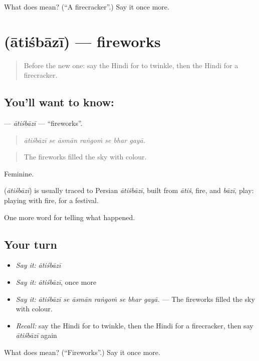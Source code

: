 \begin{tcolorbox}[breakable,colback=teal!4,colframe=teal!35!black,title={Before you move on}]
What does  mean? (\textquotedblleft{}A firecracker\textquotedblright{}.) Say it once more.
\end{tcolorbox}
\section[\texorpdfstring{\hi{आतिशबाज़ी} (ātiśbāzī)}{आतिशबाज़ी (ātiśbāzī)}]{ (ātiśbāzī) — fireworks}

\label{lesson:HI-C328-atisbazi}



\begin{quote}
Before the new one: say the Hindi for to twinkle, then the Hindi for a firecracker.
\end{quote}

\subsection*{You'll want to know: }
\textbf{} — \emph{ātiśbāzī} — \textquotedblleft{}fireworks\textquotedblright{}.

\begin{quote}
      
\end{quote}

\begin{quote}
\emph{ātiśbāzī se āsmān raṅgoṁ se bhar gayā.}
\end{quote}

\begin{quote}
The fireworks filled the sky with colour.
\end{quote}

Feminine.

\begin{cousinweb}
\textbf{} (\emph{ātiśbāzī}) is usually traced to Persian \emph{ātišbāzī}, built from \emph{ātiš}, fire, and \emph{bāzī}, play: playing with fire, for a festival.
\end{cousinweb}

\begin{grammarlens}[title={What you've built}]
One more word for telling what happened.
\end{grammarlens}

\subsection*{Your turn}
\begin{itemize}
\raggedright
  \item \emph{Say it:} \emph{ātiśbāzī}
  \item \emph{Say it:} \emph{ātiśbāzī}, once more
  \item \emph{Say it:} \emph{ātiśbāzī se āsmān raṅgoṁ se bhar gayā.} — The fireworks filled the sky with colour.
  \item \emph{Recall:} say the Hindi for to twinkle, then the Hindi for a firecracker, then say \emph{ātiśbāzī} again
\end{itemize}

\begin{tcolorbox}[breakable,colback=teal!4,colframe=teal!35!black,title={Before you move on}]
What does  mean? (\textquotedblleft{}Fireworks\textquotedblright{}.) Say it once more.
\end{tcolorbox}
